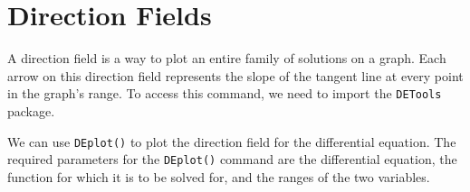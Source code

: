 \section{Direction Fields}


A direction field is a way to plot an entire family of solutions on a graph. Each arrow on this direction field represents the slope of the tangent line at every point in the graph's range. To access this command, we need to import the \texttt{DETools} package.

\begin{maplegroup}
\begin{mapleinput}
\end{mapleinput}
\end{maplegroup}


\begin{maplegroup}
\begin{mapleinput}
\end{mapleinput}
\mapleresult
{}
\begin{maplelatex}
\end{maplelatex}
\end{maplegroup}

We can use \texttt{DEplot()} to plot the direction field for the differential equation. The required parameters for the \texttt{DEplot()} command are the differential equation, the function for which it is to be solved for, and the ranges of the two variables.


\begin{maplegroup}
\begin{mapleinput}
\end{mapleinput}
\mapleresult
{}
\end{maplegroup}

